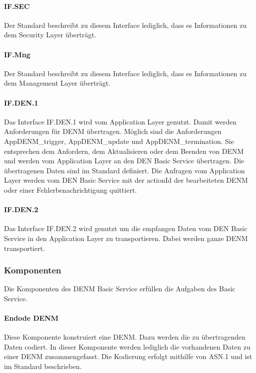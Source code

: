 \paragraph{IF.SEC}
Der Standard \cite{en302637-3} beschreibt zu diesem Interface lediglich, dass es Informationen zu dem Security Layer überträgt.  
\paragraph{IF.Mng}
Der Standard \cite{en302637-3} beschreibt zu diesem Interface lediglich, dass es Informationen zu dem Management Layer überträgt. 
\paragraph{IF.DEN.1}
Das Interface IF.DEN.1 wird vom Application Layer genutzt. Damit werden Anforderungen für \ac{DENM} übertragen. Möglich sind die Anforderungen AppDENM\_trigger, AppDENM\_update und AppDENM\_termination. Sie entsprechen dem Anfordern, dem Aktualisieren oder dem Beenden von \ac{DENM} und werden vom Application Layer an den \ac{DEN} Basic Service übertragen. Die übertragenen Daten sind im Standard \cite{en302637-3} definiert. Die Anfragen vom Application Layer werden vom \ac{DEN} Basic Service mit der actionId der bearbeiteten \ac{DENM} oder einer Fehlerbenachrichtigung quittiert.
\paragraph{IF.DEN.2}
Das Interface IF.DEN.2 wird genutzt um die empfangen Daten vom \ac{DEN} Basic Service in den Application Layer zu transportieren. Dabei werden ganze \ac{DENM} transportiert.


\subsubsection{Komponenten}
Die Komponenten des \ac{DENM} Basic Service erfüllen die Aufgaben des Basic Service.

\paragraph{Endode DENM \label{facilitylayer_EncodeDENM}}
Diese Komponente konstruiert eine \ac{DENM}. Dazu werden die zu übertragenden Daten codiert. In dieser Komponente werden lediglich die vorhandenen Daten zu einer \ac{DENM} zusammengefasst. Die Kodierung erfolgt mithilfe von \ac{ASN.1} und ist im Standard \cite{en302637-3} beschrieben. 

